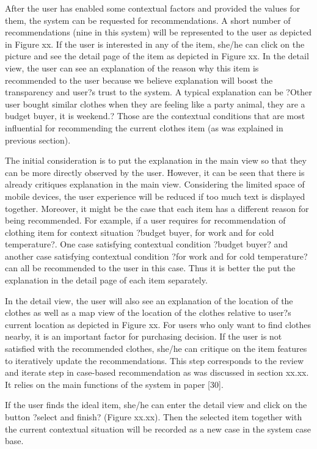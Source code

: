After the user has enabled some contextual factors and provided the values for them, the system can be requested for recommendations. A short number of recommendations (nine in this system) will be represented to the user as depicted in Figure xx. If the user is interested in any of the item, she/he can click on the picture and see the detail page of the item as depicted in Figure xx. In the detail view, the user can see an explanation of the reason why this item is recommended to the user because we believe explanation will boost the transparency and user?s trust to the system. A typical explanation can be ?Other user bought similar clothes when they are feeling like a party animal, they are a budget buyer, it is weekend.? Those are the contextual conditions that are most influential for recommending the current clothes item (as was explained in previous section). 

The initial consideration is to put the explanation in the main view so that they can be more directly observed by the user. However, it can be seen that there is already critiques explanation in the main view. Considering the limited space of mobile devices, the user experience will be reduced if too much text is displayed together. Moreover, it might be the case that each item has a different reason for being recommended. For example, if a user requires for recommendation of clothing item for context situation ?budget buyer, for work and for cold temperature?. One case satisfying contextual condition ?budget buyer? and another case satisfying contextual condition ?for work and for cold temperature? can all be recommended to the user in this case. Thus it is better the put the explanation in the detail page of each item separately.

In the detail view, the user will also see an explanation of the location of the clothes as well as a map view of the location of the clothes relative to user?s current location as depicted in Figure xx. For users who only want to find clothes nearby, it is an important factor for purchasing decision. If the user is not satisfied with the recommended clothes, she/he can critique on the item features to iteratively update the recommendations. This step corresponds to the review and iterate step in case-based recommendation as was discussed in section xx.xx. It relies on the main functions of the system in paper [30].

If the user finds the ideal item, she/he can enter the detail view and click on the button ?select and finish? (Figure xx.xx). Then the selected item together with the current contextual situation will be recorded as a new case in the system case base. 




















